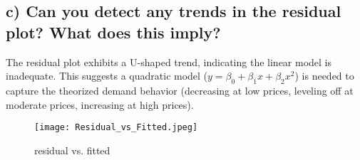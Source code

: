 \documentclass[12pt,notitlepage]{article}
\begin{document}
\subsection*{c) Can you detect any trends in the residual plot? What does this imply?}

The residual plot exhibits a U-shaped trend, indicating the linear model is inadequate. This suggests a quadratic model (\( y = \beta_0 + \beta_1 x + \beta_2 x^2 \)) is needed to capture the theorized demand behavior (decreasing at low prices, leveling off at moderate prices, increasing at high prices).



\begin{figure}[h]
    \centering
    \texttt{[image: Residual\_vs\_Fitted.jpeg]}
    \caption{residual vs. fitted}
\end{figure}
\end{document}
